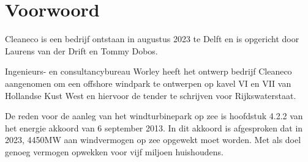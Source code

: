\section{Voorwoord}
Cleaneco is een bedrijf ontstaan in augustus 2023 te Delft en is opgericht door Laurens van der Drift en Tommy Dobos.

Ingenieurs- en consultancybureau Worley heeft het ontwerp bedrijf Cleaneco aangenomen om een offshore windpark te ontwerpen op kavel VI en VII van Hollandse Kust West en hiervoor de tender te schrijven voor Rijkswaterstaat. 

De reden voor de aanleg van het windturbinepark op zee is hoofdstuk 4.2.2 van het energie akkoord\cite{energieakkoord} van 6 september 2013. In dit akkoord is afgesproken dat in 2023, 4450MW aan windvermogen op zee opgewekt moet worden. Met als doel genoeg vermogen opwekken voor vijf miljoen huishoudens. 

